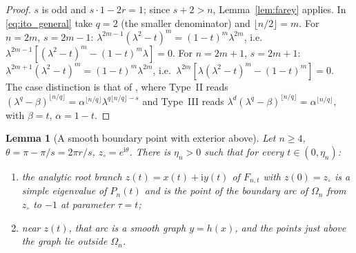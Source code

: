 \documentclass[11pt,a4paper]{article}
\numberwithin{equation}{section}
\newtheorem{lemma}[theorem]{Lemma}
\theoremstyle{definition}
\theoremstyle{remark}
\newcommand{\ii}{\mathrm{i}}
\newcommand{\Om}{\Omega}
\begin{document}
\begin{proof}
\(s\) is odd and \(s\cdot1-2r=1\); since \(s+2>n\), Lemma~\ref{lem:farey}
applies. In \eqref{eq:ito_general} take \(q=2\) (the smaller
denominator) and \(\lfloor n/2\rfloor=m\). For \(n=2m\), \(s=2m-1\):
\(\lambda^{2m-1}(\lambda^2-t)^m=(1-t)^m\lambda^{2m}\), i.e.\
\(\lambda^{2m-1}[(\lambda^2-t)^m-(1-t)^m\lambda]=0\). For \(n=2m+1\),
\(s=2m+1\): \(\lambda^{2m+1}(\lambda^2-t)^m=(1-t)^m\lambda^{2m}\), i.e.\
\(\lambda^{2m}[\lambda(\lambda^2-t)^m-(1-t)^m]=0\). The case
distinction is that of \cite{johnson2017}, where Type~II reads
\((\lambda^q-\beta)^{\lfloor n/q\rfloor}=\alpha^{\lfloor n/q\rfloor}
\lambda^{q\lfloor n/q\rfloor-s}\) and Type~III reads
\(\lambda^d(\lambda^q-\beta)^{\lfloor n/q\rfloor}=\alpha^{\lfloor
n/q\rfloor}\), with \(\beta=t\), \(\alpha=1-t\).
\end{proof}

\begin{lemma}[A smooth boundary point with exterior above]
\label{lem:general_boundary}
Let \(n\ge4\), \(\theta=\pi-\pi/s=2\pi r/s\), \(z_\circ=e^{\ii\theta}\).
There is \(\eta_n>0\) such that for every \(t\in(0,\eta_n)\):
\begin{enumerate}
\item[(i)] the analytic root branch \(z(t)=x(t)+\ii y(t)\) of
\(F_{n,t}\) with \(z(0)=z_\circ\) is a simple eigenvalue of \(P_n(t)\)
and is the point of the boundary arc of \(\Om_n\) from \(z_\circ\) to
\(-1\) at parameter \(\tau=t\);
\item[(ii)] near \(z(t)\), that arc is a smooth graph \(y=h(x)\), and
the points just above the graph lie outside \(\Om_n\).
\end{enumerate}
\end{lemma}
\end{document}
